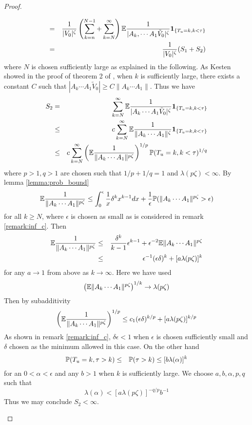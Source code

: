 \documentclass{article}
\theoremstyle{remark}
\begin{document}
\begin{proof}
\begin{enumerate}
\begin{eqnarray*}
      &=& {1 \over |V_0|^{\zeta}} \left(
        \sum_{k=n}^{N-1} + \sum_{k=N}^\infty
      \right) \E {1 \over |A_k, \cdots A_1 \tilde V_0|^{\zeta}}
      \1{T_u = k, k < \tau} \\
      &=& {1 \over |V_0|^{\zeta}}(S_1 + S_2)
      \end{eqnarray*}
      where $N$ is chosen sufficiently large as explained in the following. As
      Kesten showed in the proof of theorem 2 of \cite{Kesten1973},
      when $k$ is sufficiently large, there exists a constant $C$ such
      that $|A_k \cdots A_1 \tilde V_0| \geq C \|A_k \cdots A_1\|$. Thus we have
      \begin{eqnarray*}
        S_2 &=& \sum_{k=N}^{\infty}
        \E {1 \over |A_k \cdots A_1  \tilde V_0|^\zeta}
        \1{T_u = k, k < \tau} \\
        &\leq& c \sum_{k=N}^{\infty}
        \E {1 \over \|A_k \cdots A_1\|^\zeta} \1{T_u = k, k < \tau} \\
        &\leq& c \sum_{k=N}^{\infty}
        \left(
          \E {1 \over \|A_k \cdots A_1\|^{p \zeta}}
          \right)^{1/p}
          \P(T_u = k, k < \tau)^{1/q} \\
      \end{eqnarray*}
      where $p > 1, q > 1$ are chosen such that $1/p + 1/q = 1$ and
      $\lambda(p\zeta) < \infty$. By lemma \ref{lemma:prob_bound}
      \[
      \E {1 \over \|A_k \cdots A_1\|^{p \zeta}} \leq 
      \int_0^\epsilon {1 \over x} \delta^k x^{k-1} dx
      +
      {1 \over \epsilon} \P(\|A_k \cdots A_1\|^{p \zeta} > \epsilon)
      \]
      for all $k \geq N$, where $\epsilon$ is chosen as small as is considered in remark
      \ref{remark:inf_c}. Then
        \begin{eqnarray*}
          \E {1 \over \|A_k \cdots A_1\|^{p \zeta}} &\leq& {\delta^k
            \over k-1} \epsilon^{k-1} + \epsilon^{-2} \E \|A_k \cdots
          A_1\|^{p \zeta} \\
          &\leq& \epsilon^{-1} (\epsilon \delta)^k + [a \lambda(p\zeta)]^k
        \end{eqnarray*}
        for any $a \to 1$ from above as $k \to \infty$. Here we have used
        \[
        \left(
          \E \|A_k \cdots A_1\|^{p \zeta}
        \right)^{1/k} \to \lambda(p\zeta)
        \]
        Then by subadditivity
        \[
        \left(
          \E {
            1 \over 
            \|A_k \cdots A_1\|^{p \zeta}
          }
        \right)^{1/p} \leq c_1 (\epsilon \delta)^{k/p} + [a \lambda(p\zeta)]^{k/p}
        \]
        As shown in remark \ref{remark:inf_c}, $\delta \epsilon < 1$
        when $\epsilon$ is chosen sufficiently small and $\delta$ chosen
        as the minimum allowed in this case. On the other hand
        \begin{eqnarray*}
          \P(T_u = k, \tau > k) &\leq& \P(\tau > k) \leq [b \lambda(\alpha)]^k
        \end{eqnarray*}
        for an $0 < \alpha < \epsilon$ and any $b > 1$ when $k$ is
        sufficiently large. We choose $a, b, \alpha, p, q$ such that
        \[
        \lambda(\alpha) < [a \lambda(p\zeta)]^{-q/p} b^{-1}
        \]
        Thus we may conclude $S_2 < \infty$.


\end{enumerate}
\end{proof}
\end{document}
